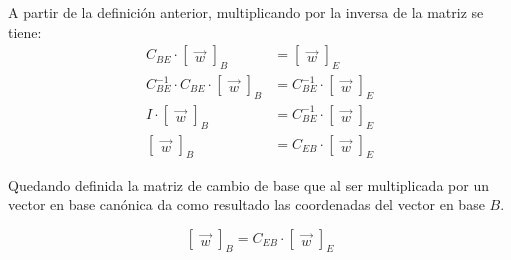 A partir de la definición anterior, multiplicando por la inversa de la matriz se tiene:
\begin{align*}
    C_{BE} \cdot
    \begin{bmatrix}
        \Vec{w}
    \end{bmatrix}_B
    &=
    \begin{bmatrix}
        \Vec{w}
    \end{bmatrix}_E
    \\[1ex]
    C_{BE}^{-1} \cdot C_{BE} \cdot
    \begin{bmatrix}
        \Vec{w}
    \end{bmatrix}_B
    &= C_{BE}^{-1} \cdot
    \begin{bmatrix}
        \Vec{w}
    \end{bmatrix}_E
    \\[1ex]
    I \cdot
    \begin{bmatrix}
        \Vec{w}
    \end{bmatrix}_B
    &= C_{BE}^{-1} \cdot
    \begin{bmatrix}
        \Vec{w}
    \end{bmatrix}_E
    \\[1ex]
    \begin{bmatrix}
        \Vec{w}
    \end{bmatrix}_B
    &= C_{EB} \cdot
    \begin{bmatrix}
        \Vec{w}
    \end{bmatrix}_E
\end{align*}

Quedando definida la matriz de cambio de base que al ser multiplicada por un vector en base canónica da como resultado las coordenadas del vector en base $B$.

\begin{mdframed}[style=DefinitionFrame]
    \begin{defn}
    \end{defn}
    \begin{equation*}
        \begin{bmatrix}
            \Vec{w}
        \end{bmatrix}_B
        = C_{EB} \cdot
        \begin{bmatrix}
            \Vec{w}
        \end{bmatrix}_E
    \end{equation*}
\end{mdframed}

